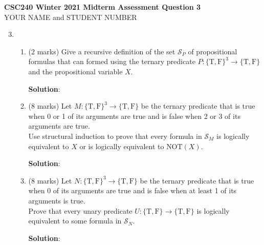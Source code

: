 \documentclass[11pt]{article}
\newcommand{\Not}{\mbox{NOT}}
\newcommand{\True}{\mbox{T}}
\newcommand{\False}{\mbox{F}}
\begin{document}
\begin{center}
{\bf \Large \bf CSC240 Winter 2021 Midterm Assessment Question 3}\\
YOUR NAME and STUDENT NUMBER
\end{center}

\medskip

\begin{enumerate}
\setcounter{enumi}{2}

\item
\begin{enumerate}
\item
\begin{question}
(2 marks)
Give a recursive definition of the set ${\mathcal S}_P$ of propositional formulas that can formed
using the ternary predicate $P:\{\True,\False\}^3 \rightarrow \{\True,\False\}$
and the propositional variable $X$.
\end{question}

\begin{solution}
{\bf Solution}:

\end{solution}

\item
\begin{question}
(8 marks)
Let $M:\{\True,\False\}^3 \rightarrow \{\True,\False\}$ be the ternary predicate that is true when 0 or 1 of its arguments are true
and is false when 2 or 3 of its arguments are true.\\
Use structural induction to prove that every formula in ${\mathcal S}_M$ is logically equivalent to $X$ or is logically equivalent to $\Not(X)$.
\end{question}


\begin{solution}
{\bf Solution}:

\end{solution}

\item
\begin{question}
(8 marks)
Let $N:\{\True,\False\}^3 \rightarrow \{\True,\False\}$ be the ternary predicate that is true when 0 of its arguments are true
and is false when at least 1 of its arguments is true.\\
Prove that every unary predicate $U:\{\True,\False\} \rightarrow \{\True,\False\}$
is logically equivalent to some formula in ${\mathcal S}_N$.
\end{question}

\begin{solution}
{\bf Solution}:

\end{solution}
\end{enumerate}
\end{enumerate}
\end{document}
